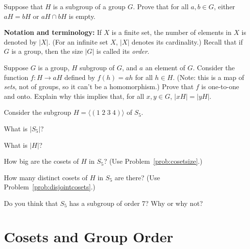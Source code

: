 \begin{problem}\label{prob:disjointcosets}
Suppose that \(H\) is a subgroup of a group \(G\). Prove that for all \(a,b\in G\), either \(aH = bH\) or \(aH \cap bH\) is empty.
\begin{annotation}
\end{annotation}
\end{problem}

\textbf{Notation and terminology:} If \(X\) is a finite set, the number of elements in \(X\) is denoted by \(\lvert X \rvert\). (For an infinite set \(X\), \(\lvert X\rvert\) denotes its cardinality.) Recall that if \(G\) is a group, then the size \(\lvert G\rvert\) is called its \emph{order}.

\begin{problem}\label{prob:cosetsize}
Suppose \(G\) is a group, \(H\) subgroup of \(G\), and \(a\) an element of \(G\). Consider the function \(f : H \longrightarrow aH\) defined by \(f(h) = ah\) for all \(h \in H\). (Note: this is a map of \emph{sets}, not of groups, so it can't be a homomorphism.) Prove that \(f\) is one-to-one and onto. Explain why this implies that, for all  \(x,y\in G\), \(\lvert xH \rvert = \lvert yH \rvert\).
\end{problem}

\begin{problem}
Consider the subgroup \(H=\langle (1\;2\;3\;4) \rangle \) of \(S_5\).
\begin{problemparts}
  \item What is \(\lvert S_5 \rvert \)?
  \item What is \( \lvert H \rvert \)?
  \item How big are the cosets of \(H\) in \(S_5\)? (Use Problem~\ref{prob:cosetsize}.)
  \item How many distinct cosets of \(H\) in \(S_5\) are there? (Use Problem~\ref{prob:disjointcosets}.)
  \item Do you think that \(S_5\) has a subgroup of order 7? Why or why not?
\end{problemparts}
\end{problem}

\section{Cosets and Group Order}

